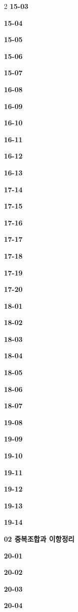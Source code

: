 \documentclass[10pt,a4paper]{article}
\begin{document}
\begin{multicols}{2}
\noindent\textbf{15-03}\ \par
\noindent\textbf{15-04}\ \par
\noindent\textbf{15-05}\ \par
\noindent\textbf{15-06}\ \par
\noindent\textbf{15-07}\ \par
\noindent\textbf{16-08}\ \par
\noindent\textbf{16-09}\ \par
\noindent\textbf{16-10}\ \par
\noindent\textbf{16-11}\ \par
\noindent\textbf{16-12}\ \par
\noindent\textbf{16-13}\ \par
\noindent\textbf{17-14}\ \par
\noindent\textbf{17-15}\ \par
\noindent\textbf{17-16}\ \par
\noindent\textbf{17-17}\ \par
\noindent\textbf{17-18}\ \par
\noindent\textbf{17-19}\ \par
\noindent\textbf{17-20}\ \par
\noindent\textbf{18-01}\ \par
\noindent\textbf{18-02}\ \par
\noindent\textbf{18-03}\ \par
\noindent\textbf{18-04}\ \par
\noindent\textbf{18-05}\ \par
\noindent\textbf{18-06}\ \par
\noindent\textbf{18-07}\ \par
\noindent\textbf{19-08}\ \par
\noindent\textbf{19-09}\ \par
\noindent\textbf{19-10}\ \par
\noindent\textbf{19-11}\ \par
\noindent\textbf{19-12}\ \par
\noindent\textbf{19-13}\ \par
\noindent\textbf{19-14}\ \par
\noindent\textbf{02 중복조합과 이항정리}\par\smallskip
\noindent\textbf{20-01}\ \par
\noindent\textbf{20-02}\ \par
\noindent\textbf{20-03}\ \par
\noindent\textbf{20-04}\ \par

\end{multicols}
\end{document}
